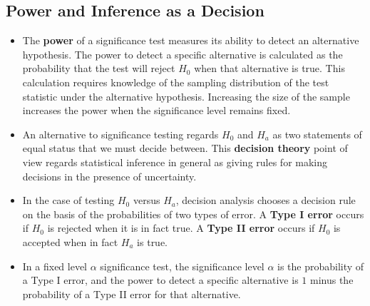 	\subsection{Power and Inference as a Decision}
		\begin{itemize}
			\item The \textbf{power} of a significance test measures its ability to detect an alternative hypothesis. The power to detect a specific alternative is calculated as the probability that the test will reject $H_0$ when that alternative is true. This calculation requires knowledge of the sampling distribution of the test statistic under the alternative hypothesis. Increasing the size of the sample increases the power when the significance level remains fixed.
			
			\item An alternative to significance testing regards $H_0$ and $H_a$ as two statements of equal status that we must decide between. This \textbf{decision theory} point of view regards statistical inference in general as giving rules for making decisions in the presence of uncertainty.
			
			\item In the case of testing $H_0$ versus $H_a$, decision analysis chooses a decision rule on the basis of the probabilities of two types of error. A \textbf{Type I error} occurs if $H_0$ is rejected when it is in fact true. A \textbf{Type II error} occurs if $H_0$ is accepted when in fact $H_a$ is true.
			
			\item In a fixed level $\alpha$ significance test, the significance level $\alpha$ is the probability of a Type I error, and the power to detect a specific alternative is $1$ minus the probability of a Type II error for that alternative.
		\end{itemize}